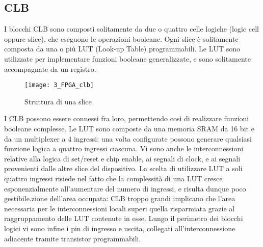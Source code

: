 \subsection{CLB}
I blocchi CLB sono composti solitamente da due o quattro celle logiche (logic cell oppure slice), che eseguono le operazioni booleane. Ogni slice è solitamente composta da una o più LUT (Look-up Table) programmabili. Le LUT sono utilizzate per implementare funzioni booleane generalizzate, e sono solitamente accompagnate da un registro.
\begin{figure}[H]
	\centering
	\texttt{[image: 3\_FPGA\_clb]}
	\caption{Struttura di una slice}
	\label{fig:fpga_clb}
\end{figure}
\noindent
I CLB possono essere connessi fra loro, permettendo così di realizzare funzioni booleane complesse. Le LUT sono composte da una memoria SRAM da 16 bit e da un multiplexer a 4 ingressi: una volta configurate possono generare qualsiasi funzione logica a quattro ingressi ciascuna. Vi sono anche le interconnessioni relative alla logica di set/reset e chip enable, ai segnali di clock, e ai segnali provenienti dalle altre slice del dispositivo. La scelta di utilizzare LUT a soli quattro ingressi risiede nel fatto che la complessità di una LUT cresce esponenzialmente all'aumentare del numero di ingressi, e risulta dunque poco gestibile.zione dell'area occupata: CLB troppo grandi implicano che l'area necessaria per le interconnessioni locali superi quella risparmiata grazie al raggruppamento delle LUT contenute in esse. Lungo il perimetro dei blocchi logici vi sono infine i pin di ingresso e uscita, collegati all'interconnessione adiacente tramite transistor programmabili.

